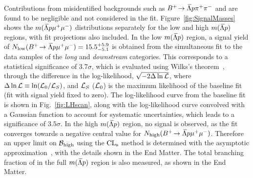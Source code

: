 Contributions from misidentified backgrounds such as $\mbox{\ensuremath{B^{+}\!\rightarrow {\ensuremath{\kern 0.18em\overline{\kern -0.18em \Lambda}}} p \pi^{+} \pi^{-}}}$ and  are found to be negligible and not considered in the fit. Figure~\ref{fig:SignalMasses} shows the $m({\kern 0.18em\overline{\kern -0.18em \Lambda}} p{\mu^+\mu^-})$
distributions separately for the low and high $m({\kern 0.18em\overline{\kern -0.18em \Lambda}} p)$ regions, with fit projections also included. In the low $m({\kern 0.18em\overline{\kern -0.18em \Lambda}} p)$ region, a signal yield of
$N_{\rm low}(\mbox{\ensuremath{B^{+}\!\rightarrow {\ensuremath{\kern 0.18em\overline{\kern -0.18em \Lambda}}} p \mu^{+} \mu^{-}}})=15.5^{+5.9}_{-5.1}$
is obtained from the simultaneous fit to the data samples of the \emph{long} and \emph{downstream} categories. This corresponds to a statistical significance of 3.7$\sigma$, which is evaluated using
Wilks’s theorem~\cite{Wilks:1938dza}, through the difference in the log-likelihood,
$\sqrt{-2\Delta \ln {\cal L}}$,
where $\Delta \ln {\cal L}\equiv \ln({\cal L}_0/{\cal L}_S)$, and ${\cal L}_S$ (${\cal L}_0$) is the maximum likelihood of the baseline fit (fit with signal yield fixed to zero). The log-likelihood curve from the baseline fit is shown in Fig.~\ref{fig:LHscan}, along with the log-likelihood curve convolved with a Gaussian function to account for systematic uncertainties,
which leads to a significance of $3.5\sigma$.
In the high $m({\kern 0.18em\overline{\kern -0.18em \Lambda}} p)$ region, no signal is observed, as the fit converges towards a negative central value for $N_{\rm high}(\mbox{\ensuremath{B^{+}\!\rightarrow {\ensuremath{\kern 0.18em\overline{\kern -0.18em \Lambda}}} p \mu^{+} \mu^{-}}})$. Therefore  an upper limit on ${\cal B}_{\rm high}$ using the ${\rm CL}_{\rm s}$ method is determined with the asymptotic approximation~\cite{Read:2002hq,Cowan:2010js}, with the details shown in the End Matter. The total branching fraction of \btlpmm  in the full $m({\kern 0.18em\overline{\kern -0.18em \Lambda}} p)$ region is also measured, as shown in the End Matter.

